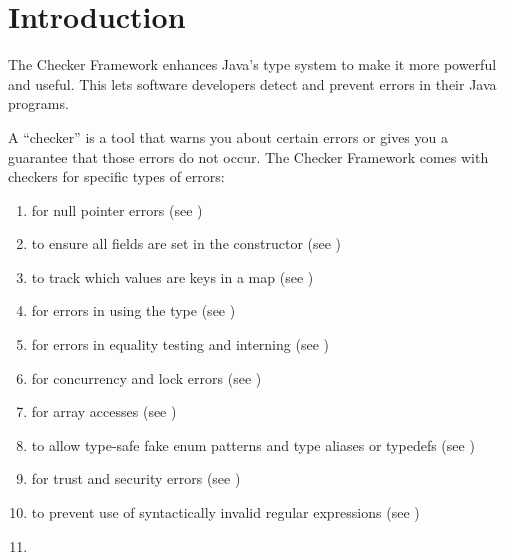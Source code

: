 \htmlhr
\chapter{Introduction\label{introduction}}

The Checker Framework enhances Java's type system to make it more powerful
and useful.
This lets software developers detect and
prevent errors in their Java programs.

A ``checker'' is a tool that warns you about certain errors or gives you a
guarantee that those errors do not occur.
The Checker Framework comes with checkers for specific types of errors:

\begin{enumerate}

\item
   for null pointer errors
  (see )
\item
   to ensure all
  fields are set in the constructor (see
  )
\item
   to track which values are
  keys in a map (see )
\item
   for errors in using the
   type (see
  )
\item
   for errors in equality
  testing and interning (see )
\item
   for concurrency and lock errors
  (see )
\item
   for array accesses
  (see )
\item
   to allow type-safe fake enum
  patterns and type aliases or typedefs (see )
\item
   for trust and security errors
  (see )
\item
   to prevent use of syntactically
  invalid regular expressions (see )
\item

\end{enumerate}
